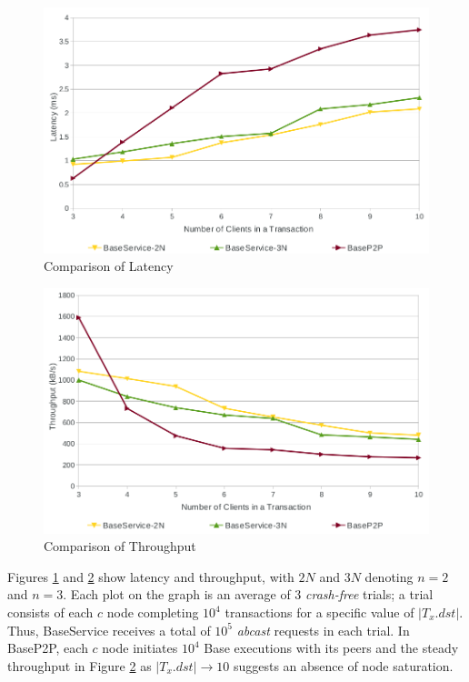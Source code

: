 \begin{figure}[htbp!]
 \includegraphics[width=\textwidth,height=\textheight,keepaspectratio]{latency}
 \caption{Comparison of Latency}
 \label{fig:LatencyGraph}
\end{figure}

\begin{figure}[htbp!]
 \includegraphics[width=\textwidth,height=\textheight,keepaspectratio]{throughput}
 \caption{Comparison of Throughput}
 \label{fig:ThroughputGraph}
\end{figure}

Figures \ref{fig:LatencyGraph} and \ref{fig:ThroughputGraph} show latency and throughput, with $2N$ and $3N$ denoting $n=2$ and $n=3$. Each plot on the graph is an average of 3 \emph{crash-free} trials; a trial consists of each $c$ node completing $10^4$ transactions for a specific value of $|T_x.dst|$. Thus, BaseService receives a total of $10^5$ \emph{abcast} requests in each trial. In BaseP2P, each $c$ node initiates $10^4$ Base executions with its peers and the steady throughput in Figure \ref{fig:ThroughputGraph} as $|T_x.dst| \rightarrow 10$ suggests an absence of node saturation.

